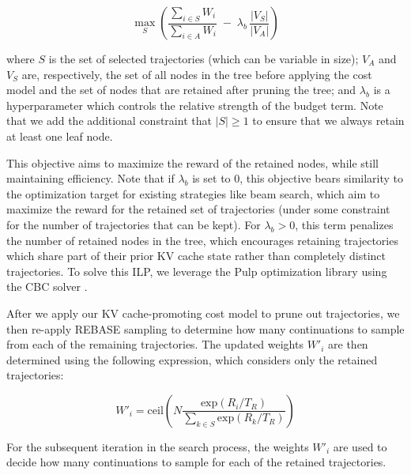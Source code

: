\begin{equation}
    \label{eq:cost_model_v1}
    \max_{S}( \frac{\sum_{i \in S} W_i}{\sum_{i \in A} W_i} 
   \;-\;
   \lambda_b \,\frac{|V_S|}{|V_A|} )
\end{equation}

where $S$ is the set of selected trajectories (which can be variable in size);
$V_A$ and $V_S$ are, respectively, the set of all nodes in the tree before applying the cost model and the set of nodes that are retained after pruning the tree; and $\lambda_b$ is a hyperparameter which controls the relative strength of the budget term. 
Note that we add the additional constraint that $|S| \geq 1$ to ensure that we always retain at least one leaf node.

This objective aims to maximize the reward of the retained nodes, while still maintaining efficiency.
Note that if $\lambda_b$ is set to 0, this objective bears similarity to the optimization target for existing strategies like beam search, which aim to maximize the reward for the retained set of trajectories (under some constraint for the number of trajectories that can be kept).
For $\lambda_b > 0$, this term penalizes the number of retained nodes in the tree, which encourages retaining trajectories which share part of their prior KV cache state rather than completely distinct trajectories.
To solve this ILP, we leverage the Pulp optimization library \cite{mitchell2011pulp} using the CBC solver \cite{john_forrest_2024_13347261}.

After we apply our KV cache-promoting cost model to prune out trajectories, we then re-apply REBASE sampling to determine how many continuations to sample from each of the remaining trajectories.
The updated weights $W'_i$ are then determined using the following expression, which considers only the retained trajectories:

\begin{equation}
    \label{eq:rebase_v2}
    W'_i = \mathrm{ceil} ( N \frac{\mathrm{exp}(R_i / T_R)}{\sum_{k \in S}\mathrm{exp}(R_k / T_R)}  )
\end{equation}

For the subsequent iteration in the search process, the weights $W'_i$ are used to decide how many continuations to sample for each of the retained trajectories.

